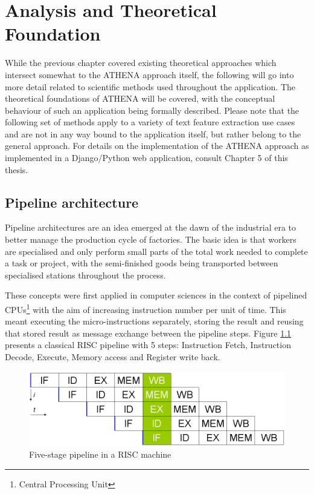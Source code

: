 \documentclass[12pt,a4paper,twoside]{report}
\begin{document}
\newpage

\listoffigures
\tableofcontents
\newpage







\chapter{Analysis and Theoretical Foundation}
\label{ch:analysis}
While the previous chapter covered existing theoretical approaches which intersect somewhat to the ATHENA approach itself, the following will go into more detail related to scientific methods used throughout the application. The theoretical foundations of ATHENA will be covered, with the conceptual behaviour of such an application being formally described. Please note that the following set of methods apply to a variety of text feature extraction use cases and are not in any way bound to the application itself, but rather belong to the general approach. For details on the implementation of the ATHENA approach as implemented in a Django/Python web application, consult Chapter 5 of this thesis.

\section{Pipeline architecture}
Pipeline architectures are an idea emerged at the dawn of the industrial era to better manage the production cycle of factories. The basic idea is that workers are specialised and only perform small parts of the total work needed to complete a task or project, with the semi-finished goods being transported between specialised stations throughout the process.

These concepts were first applied in computer sciences in the context of pipelined CPUs\footnote{Central Processing Unit} with the aim of increasing instruction number per unit of time. This meant executing the micro-instructions separately, storing the result and reusing that stored result as message exchange between the pipeline steps. Figure \ref{fig:cpupipe} presents a classical RISC pipeline with 5 steps: Instruction Fetch, Instruction Decode, Execute, Memory access and Register write back.

\begin{figure}
    \centering
\includegraphics[width=0.8\columnwidth]{img/cpupipe.png}
    \caption{Five-stage pipeline in a RISC machine}
    \label{fig:cpupipe}
\end{figure}
\end{document}
